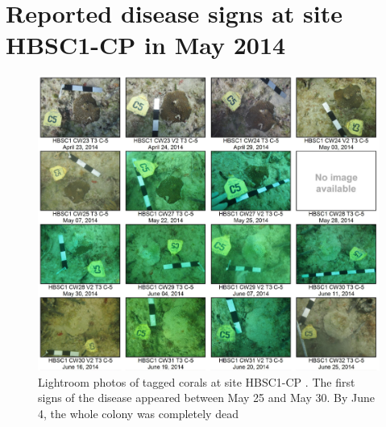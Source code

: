 \documentclass[preprint,12pt,authoryear]{elsarticle}
\begin{document}
\section{Reported disease signs at site HBSC1-CP in May 2014}\label{onset:appendice}
\begin{figure}[h!]
	\centering
	\includegraphics[width=\textwidth]{figures/hbsc1_cp.png}
	\caption{Lightroom photos of tagged corals at site HBSC1-CP \citep{dial2017}. The first signs of the disease appeared between May 25 and May 30. By June 4, the whole colony was completely dead}
\end{figure}
\newpage
\end{document}
